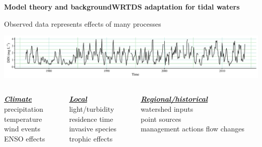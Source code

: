 \documentclass[serif]{beamer}\usepackage[]{graphicx}\usepackage[]{color}
\newcommand{\emtxt}[1]{\textbf{\textit{#1}}}
\begin{document}
\begin{frame}[t]{\textbf{Model theory and background}}{\textbf{WRTDS adaptation for tidal waters}}
{\bf \centerline{Observed data represents effects of many processes}}
\vspace{0.15in}
\centerline{\includegraphics[width = \textwidth]{fig/ts_ex.pdf}}
\vspace{0.15in}
\begin{columns}[t]
\begin{column}{0.3\textwidth}
{\bf \underline{\emtxt{Climate}}}\\
precipitation\\
temperature\\
wind events\\
ENSO effects
\end{column}
\begin{column}{0.3\textwidth}
{\bf \underline{\emtxt{Local}}}\\
light/turbidity\\
residence time\\
invasive species\\
trophic effects
\end{column}
\begin{column}{0.3\textwidth}
{\bf \underline{\emtxt{Regional/historical}}}\\
watershed inputs\\
point sources\\
management actions
flow changes
\end{column}
\end{columns}
\end{frame}
\end{document}

